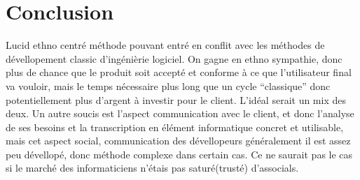 \documentclass[11pt,a4paper]{article}
\begin{document}
\section{Conclusion}
Lucid ethno centré
méthode pouvant entré en conflit avec les méthodes de dévellopement classic
d'ingénièrie logiciel.
On gagne en ethno sympathie, donc plus de chance que le produit soit accepté et
conforme à ce que l'utilisateur final va vouloir, mais le temps nécessaire plus
long que un cycle ``classique'' donc potentiellement plus d'argent à investir
pour le client. L'idéal serait un mix des deux.
Un autre soucis est l'aspect communication avec le client, et donc l'analyse de
ses besoins et la transcription en élément informatique concret et utilisable,
mais cet aspect social, communication des dévellopeurs généralement il est assez
peu dévellopé, donc méthode complexe dans certain cas. Ce ne saurait pas le cas
si le marché des informaticiens n'étais pas saturé(trusté) d'associals. 
  
  
\end{document}
